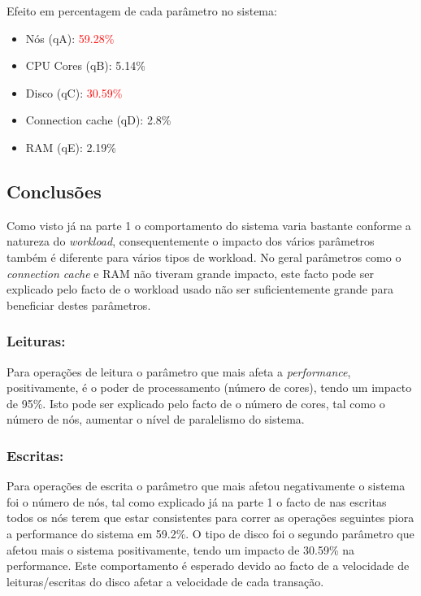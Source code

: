 Efeito em percentagem de cada parâmetro no sistema:
\begin{itemize}
    \item Nós (qA): \textcolor{red}{59.28\%}
    \item CPU Cores (qB): 5.14\%
    \item Disco (qC): \textcolor{red}{30.59\%}
    \item Connection cache (qD): 2.8\%
    \item RAM (qE): 2.19\%
\end{itemize}

\subsection{Conclusões}
Como visto já na parte 1 o comportamento do sistema varia bastante conforme a natureza do \textit{workload}, consequentemente o impacto dos vários parâmetros também é diferente para vários tipos de workload. No geral parâmetros como o \textit{connection cache} e RAM não tiveram grande impacto, este facto pode ser explicado pelo facto de o workload usado não ser suficientemente grande para beneficiar destes parâmetros.

\subsubsection{Leituras:}
Para operações de leitura o parâmetro que mais afeta a \textit{performance}, positivamente, é o poder de processamento (número de cores), tendo um impacto de 95\%. Isto pode ser explicado pelo facto de o número de cores, tal como o número de nós, aumentar o nível de paralelismo do sistema.

\subsubsection{Escritas:}
Para operações de escrita o parâmetro que mais afetou negativamente o sistema foi o número de nós, tal como explicado já na parte 1 o facto de nas escritas todos os nós terem que estar consistentes para correr as operações seguintes piora a performance do sistema em 59.2\%. O tipo de disco foi o segundo parâmetro que afetou mais o sistema positivamente, tendo um impacto de 30.59\% na performance. Este comportamento é esperado devido ao facto de a velocidade de leituras/escritas do disco afetar a velocidade de cada transação.